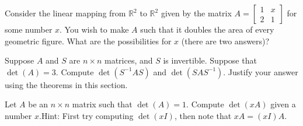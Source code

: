 \begin{exercise}
Consider the linear mapping from ${\mathbb R}^2$ to ${\mathbb R}^2$
given by the  matrix
$A = \left[ \begin{smallmatrix}
1 & x \\
2 & 1
\end{smallmatrix} \right]$
for some number $x$.  You wish to make $A$ such that it doubles the area of
every geometric figure.  What are the possibilities for $x$ (there are two
answers)?
\end{exercise}

\begin{exercise}
Suppose $A$ and $S$ are $n \times n$ matrices, and $S$ is invertible.
Suppose that $\det(A) = 3$.  Compute $\det(S^{-1}AS)$ and
$\det(SAS^{-1})$.  Justify your answer using the theorems in this section.
\end{exercise}

\begin{exercise}
Let $A$ be an $n \times n$ matrix such that $\det(A)=1$.
Compute $\det(x A)$ given a number $x$.\linebreak[2]
Hint: First try computing
$\det(xI)$, then note that $xA = (xI)A$.
\end{exercise}

\setcounter{exercise}{100}

